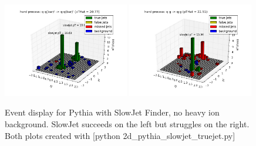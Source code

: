 \documentclass[11pt]{article}
\begin{document}
\begin{figure}[h]
\begin{center}
\includegraphics[width=0.49\textwidth]{2d_pythia_slowjet_truejet1.png}
\includegraphics[width=0.49\textwidth]{2d_pythia_slowjet_truejet2.png}
\caption{Event display for Pythia with SlowJet Finder, no heavy ion background.  SlowJet succeeds on the left but struggles on the right. Both plots created with [python 2d\_pythia\_slowjet\_truejet.py]}
\label{fig_2d_pythia_slowjet_truejet}
\end{center}
\end{figure}
\end{document}
